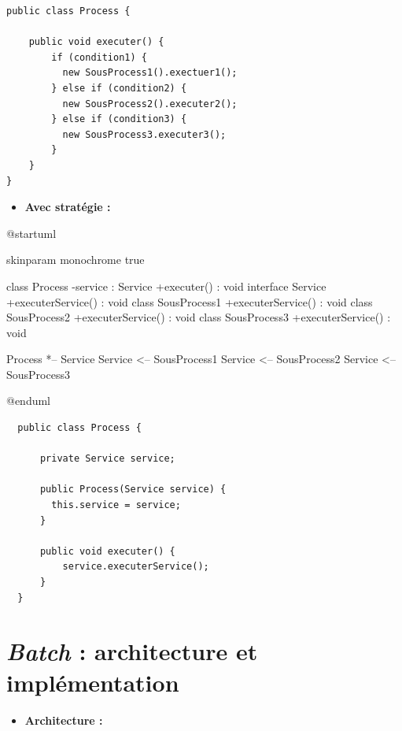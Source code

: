 \documentclass[a4paper, 12pt]{report}
\begin{document}
\begin{lstlisting}
public class Process {

    public void executer() {
        if (condition1) {
          new SousProcess1().exectuer1();
        } else if (condition2) {
          new SousProcess2().executer2();
        } else if (condition3) {
          new SousProcess3.executer3();
        }
    }    
}
\end{lstlisting}
\clearpage

\begin{itemize}
  \item \textbf{Avec stratégie :}\\
\end{itemize}

\begin{center}
  \begin{plantuml}
    @startuml

    skinparam monochrome true

    class Process {
      -service : Service
      +executer() : void
    }
    interface Service {
      +executerService() : void
    }
    class SousProcess1 {
      +executerService() : void
    }
    class SousProcess2 {
      +executerService() : void
    }
    class SousProcess3 {
      +executerService() : void
    }

    Process *-- Service
    Service <-- SousProcess1
    Service <-- SousProcess2
    Service <-- SousProcess3

    @enduml
  \end{plantuml}
\end{center}
\vspace{0.5cm}

\begin{lstlisting}
  public class Process {

      private Service service;

      public Process(Service service) {
        this.service = service;
      }
  
      public void executer() {
          service.executerService();
      }    
  }
  \end{lstlisting}

\chapter{\textit{Batch} : architecture et implémentation}
\label{appendix:batch}

\begin{itemize}
  \item \textbf{Architecture :}\\
\end{itemize}
\end{document}
